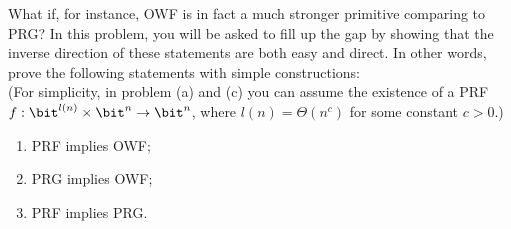 \begin{problem}\label{p3}
    \leavevmode\par
    What if, for instance, OWF is in fact a much stronger primitive comparing to PRG?
    In this problem, you will be asked to fill up the gap by showing that the inverse direction of these statements are both easy and direct. In other words, prove the following statements with simple constructions:\\
    (For simplicity, in problem (a) and (c) you can assume the existence of a PRF $f: \bit^{l(n)}\times \bit^n\to \bit^n$, where $l(n)=\Theta(n^c)$ for some constant $c\gt 0$.)
    \begin{enumerate}[label=(\alph*)]
        \item PRF implies OWF;
        \item PRG implies OWF;
        \item PRF implies PRG.
    \end{enumerate}
\end{problem}


